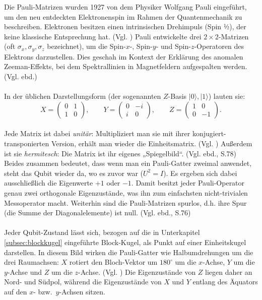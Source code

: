 Die Pauli-Matrizen wurden 1927 von dem Physiker Wolfgang Pauli eingeführt, um den neu entdeckten Elektronenspin im Rahmen der Quantenmechanik zu beschreiben. Elektronen besitzen einen intrinsischen Drehimpuls (Spin ½), der keine klassische Entsprechung hat. (Vgl. \cite[S.312]{wekesa_sirengo_mathematical_2024}) Pauli entwickelte drei $2\times 2$-Matrizen (oft $\sigma_x, \sigma_y, \sigma_z$ bezeichnet), um die Spin-$x$-, Spin-$y$- und Spin-$z$-Operatoren des Elektrons darzustellen. Dies geschah im Kontext der Erklärung des anomalen Zeeman-Effekts, bei dem Spektrallinien in Magnetfeldern aufgespalten werden. (Vgl. ebd.)\\
\\
In der üblichen Darstellungsform (der sogenannten $Z$-Basis ${|0\rangle,|1\rangle}$) lauten sie:
\\
\begin{equation}
\label{equ:pauli_matrizen}
  X=\begin{pmatrix}0&1\\ 1&0\end{pmatrix},\qquad
  Y=\begin{pmatrix}0&-i\\ i&0\end{pmatrix},\qquad
  Z=\begin{pmatrix}1&0\\ 0&-1\end{pmatrix}.
\end{equation}
\\
Jede Matrix ist dabei \emph{unitär}: Multipliziert man sie mit ihrer konjugiert-transponierten Version, erhält man wieder die Einheitsmatrix. (Vgl. \cite[S.71]{nielsen_quantum_2010}) Außerdem ist sie \emph{hermitesch}: Die Matrix ist ihr eigenes „Spiegelbild“. (Vgl. ebd., S.78) Beides zusammen bedeutet, dass wenn man ein Pauli-Gatter zweimal anwendet, steht das Qubit wieder da, wo es zuvor war ($U^2=I$). Es ergeben sich dabei ausschließlich die Eigenwerte $+1$ oder $-1$. Damit besitzt jeder Pauli-Operator genau zwei orthogonale Eigenzustände, was ihn zum einfachsten nicht-trivialen Messoperator macht. Weiterhin sind die Pauli-Matrizen spurlos, d.h. ihre Spur (die Summe der Diagonalelemente) ist null. (Vgl. ebd., S.76)\\
\\
Jeder Qubit-Zustand lässt sich, bezogen auf die in Unterkapitel \ref{subsec:blockkugel} eingeführte Block-Kugel, als Punkt auf einer Einheitskugel darstellen. In diesem Bild wirken die Pauli-Gatter wie Halbumdrehungen um die drei Raumachsen: $X$ rotiert den Bloch-Vektor um $180^{\circ}$ um die $x$-Achse, $Y$ um die $y$-Achse und $Z$ um die $z$-Achse. (Vgl. \cite[S.215ff.]{rieffel_quantum_2011}) Die Eigenzustände von $Z$ liegen daher an Nord- und Südpol, während die Eigenzustände von $X$ und $Y$ entlang des Äquators auf den $x$- bzw.\ $y$-Achsen sitzen.

